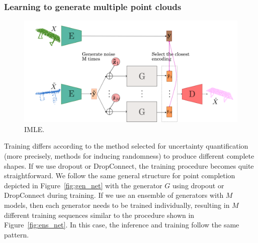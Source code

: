         \subsubsection{Learning to generate multiple point clouds}
        \begin{figure}[htb]
          \begin{center}
          \includegraphics[width=\linewidth]{figures/implicit_gen_network_imle.png}
          \end{center}
          \caption{IMLE.}\label{fig:imle}
        \end{figure}
        Training differs according to the method selected for uncertainty quantification (more precisely, methods for inducing randomness) to produce different complete shapes. If we use dropout or DropConnect, the training procedure becomes quite straightforward. We follow the same general structure for point completion depicted in Figure~\ref{fig:gen_net} with the generator $G$ using dropout or DropConnect during training. If we use an ensemble of generators with $M$ models, then each generator needs to be trained individually, resulting in $M$ different training sequences similar to the procedure shown in Figure~\ref{fig:ens_net}. In this case, the inference and training follow the same pattern. 
        \newline
        
